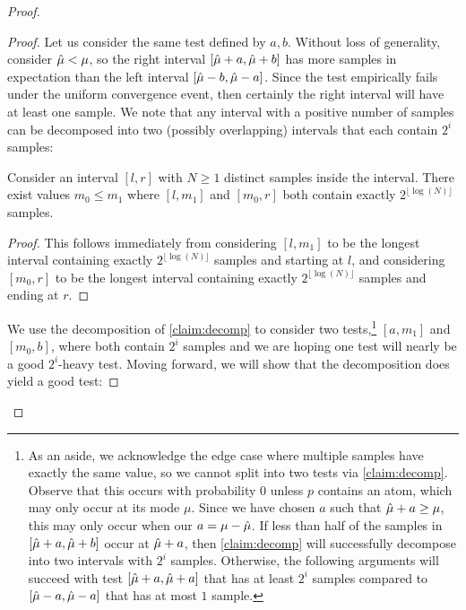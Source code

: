 \begin{proof}
\begin{proof}
        Let us consider the same test defined by $a,b$. Without loss of generality, consider $\hat{\mu} < \mu$, so the right interval $[\hat{\mu} + a, \hat{\mu} + b]$ has more samples in expectation than the left interval $[\hat{\mu} - b, \hat{\mu} -a]$. Since the test empirically fails under the uniform convergence event, then certainly the right interval will have at least one sample. We note that any interval with a positive number of samples can be decomposed into two (possibly overlapping) intervals that each contain $2^i$ samples:

        \begin{claim}\label{claim:decomp}
            Consider an interval $[l,r]$ with $N \ge 1$ distinct samples inside the interval. There exist values $m_0 \le m_1$ where $[l,m_1]$ and $[m_0,r]$ both contain exactly $2^{\lfloor \log(N) \rfloor}$ samples.
        \end{claim}
        \begin{proof}
            This follows immediately from considering $[l,m_1]$ to be the longest interval containing exactly $2^{\lfloor \log(N) \rfloor}$ samples and starting at $l$, and considering $[m_0,r]$ to be the longest interval containing exactly $2^{\lfloor \log(N) \rfloor}$ samples and ending at $r$.
        \end{proof}

        We use the decomposition of \cref{claim:decomp} to consider two tests,\footnote{As an aside, we acknowledge the edge case where multiple samples have exactly the same value, so we cannot split into two tests via \cref{claim:decomp}. Observe that this occurs with probability $0$ unless $p$ contains an atom, which may only occur at its mode $\mu$. Since we have chosen $a$ such that $\hat{\mu} + a \ge \mu$, this may only occur when our $a = \mu - \hat{\mu}$. If less than half of the samples in $[\hat{\mu} + a,\hat{\mu} + b]$ occur at $\hat{\mu}+a$, then \cref{claim:decomp} will successfully decompose into two intervals with $2^i$ samples. Otherwise, the following arguments will succeed with test $[\hat{\mu}+a,\hat{\mu}+a]$ that has at least $2^i$ samples compared to $[\hat{\mu}-a,\hat{\mu}-a]$ that has at most $1$ sample.}
        $[a,m_1]$ and $[m_0,b]$, where both contain $2^i$ samples and we are hoping one test will nearly be a good $2^i$-heavy test. Moving forward, we will show that the decomposition does yield a good test:



\end{proof}
\end{proof}
